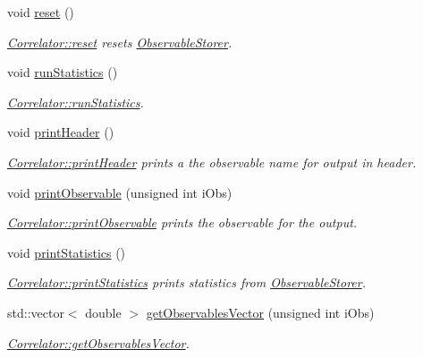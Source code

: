 \begin{DoxyCompactItemize}
void \mbox{\hyperlink{class_master_sampler_a275a032513db03c899056fd07d71cc89}{reset}} ()
\begin{DoxyCompactList}\small\item\em \mbox{\hyperlink{class_correlator_aacca40262d2cd62f0a3964e832f948c1}{Correlator\+::reset}} resets \mbox{\hyperlink{class_observable_storer}{Observable\+Storer}}. \end{DoxyCompactList}\item 
void \mbox{\hyperlink{class_master_sampler_ab7913d0dbdea57af3f469a3cdd74f8fc}{run\+Statistics}} ()
\begin{DoxyCompactList}\small\item\em \mbox{\hyperlink{class_correlator_a35197b1d12b62ef30b79c0138a26456e}{Correlator\+::run\+Statistics}}. \end{DoxyCompactList}\item 
void \mbox{\hyperlink{class_master_sampler_a51b207672764c100e1ae258fd2e33fcf}{print\+Header}} ()
\begin{DoxyCompactList}\small\item\em \mbox{\hyperlink{class_correlator_ac7c5a07d7cbee97c417a1659b93083b2}{Correlator\+::print\+Header}} prints a the observable name for output in header. \end{DoxyCompactList}\item 
void \mbox{\hyperlink{class_master_sampler_a41853c3e4ab52fca7d93cf80e8702b7a}{print\+Observable}} (unsigned int i\+Obs)
\begin{DoxyCompactList}\small\item\em \mbox{\hyperlink{class_correlator_a15744ddb9f2b71fff34ac762d101df38}{Correlator\+::print\+Observable}} prints the observable for the output. \end{DoxyCompactList}\item 
void \mbox{\hyperlink{class_master_sampler_a9accfc83c05d3013396355e40257a562}{print\+Statistics}} ()
\begin{DoxyCompactList}\small\item\em \mbox{\hyperlink{class_correlator_a2168d677f547769784781d2e2aaa53cf}{Correlator\+::print\+Statistics}} prints statistics from \mbox{\hyperlink{class_observable_storer}{Observable\+Storer}}. \end{DoxyCompactList}\item 
std\+::vector$<$ double $>$ \mbox{\hyperlink{class_master_sampler_a471dffa3f29c68b4152b195708a9a5ac}{get\+Observables\+Vector}} (unsigned int i\+Obs)
\begin{DoxyCompactList}\small\item\em \mbox{\hyperlink{class_correlator_a7fb062b098beb078f3e546f4717b4941}{Correlator\+::get\+Observables\+Vector}}. \end{DoxyCompactList}\item 

\end{DoxyCompactItemize}
